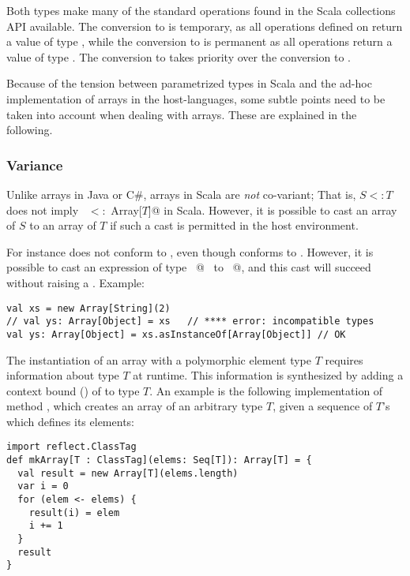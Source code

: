 Both types make many of the standard operations found in the Scala
collections API available. The conversion to  is temporary, as all operations
defined on  return a value of type , while the conversion to 
is permanent as all operations return a value of type .
The conversion to  takes priority over the conversion to .

Because of the tension between parametrized types in Scala and the ad-hoc
implementation of arrays in the host-languages, some subtle points
need to be taken into account when dealing with arrays. These are
explained in the following.

\subsubsection{Variance}

Unlike arrays in Java or C\#, arrays in Scala are {\em not}
co-variant; That is, $S <: T$ does not imply 
~\lstinline@Array[$S$] $<:$ Array[$T$]@ in Scala.  
However, it is possible to cast an array
of $S$ to an array of $T$ if such a cast is permitted in the host
environment.

For instance  does not conform to
, even though  conforms to .
However, it is possible to cast an expression of type
~\lstinline@Array[String]@~ to ~\lstinline@Array[Object]@, and this
cast will succeed without raising a . Example:
\begin{lstlisting}
val xs = new Array[String](2)
// val ys: Array[Object] = xs   // **** error: incompatible types
val ys: Array[Object] = xs.asInstanceOf[Array[Object]] // OK
\end{lstlisting}

The instantiation of an array with a polymorphic element type $T$ requires
information about type $T$ at runtime.
This information is synthesized by adding a context bound ()
of  to type $T$.
An example is the
following implementation of method \lstinline@mkArray@, which creates
an array of an arbitrary type $T$, given a sequence of $T$'s which
defines its elements:
\begin{lstlisting}
import reflect.ClassTag
def mkArray[T : ClassTag](elems: Seq[T]): Array[T] = {
  val result = new Array[T](elems.length)
  var i = 0
  for (elem <- elems) {
    result(i) = elem
    i += 1
  }
  result
}
\end{lstlisting}


